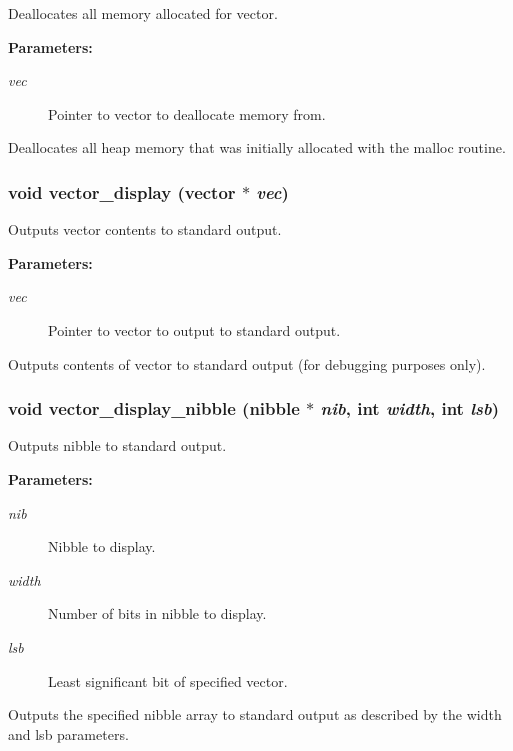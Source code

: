 Deallocates all memory allocated for vector.

\begin{Desc}
\item[{\bf Parameters: }]\par
\begin{description}
\item[
{\em vec}]Pointer to vector to deallocate memory from.

\end{description}
\end{Desc}
Deallocates all heap memory that was initially allocated with the malloc routine. 
\subsubsection{\setlength{\rightskip}{0pt plus 5cm}void vector\_\-display ({\bf vector} $\ast$ {\em vec})}\label{vector_8h_a9}


Outputs vector contents to standard output.

\begin{Desc}
\item[{\bf Parameters: }]\par
\begin{description}
\item[
{\em vec}]Pointer to vector to output to standard output.

\end{description}
\end{Desc}
Outputs contents of vector to standard output (for debugging purposes only). 
\subsubsection{\setlength{\rightskip}{0pt plus 5cm}void vector\_\-display\_\-nibble ({\bf nibble} $\ast$ {\em nib}, int {\em width}, int {\em lsb})}\label{vector_8h_a8}


Outputs nibble to standard output.

\begin{Desc}
\item[{\bf Parameters: }]\par
\begin{description}
\item[
{\em nib}]Nibble to display. \item[
{\em width}]Number of bits in nibble to display. \item[
{\em lsb}]Least significant bit of specified vector.

\end{description}
\end{Desc}
Outputs the specified nibble array to standard output as described by the width and lsb parameters. 
